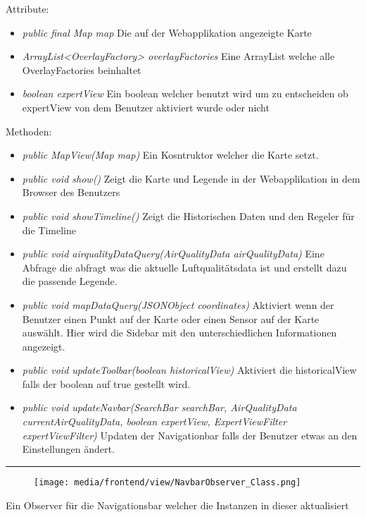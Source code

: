 Attribute:
\begin{itemize} 
    \item \emph{public final Map map} Die auf der Webapplikation angezeigte Karte
    \item \emph{ArrayList<OverlayFactory> overlayFactories} Eine ArrayList welche alle OverlayFactories beinhaltet
    \item \emph{boolean expertView} Ein boolean welcher benutzt wird um zu entscheiden ob expertView von dem Benutzer aktiviert wurde oder nicht
\end{itemize} 
Methoden:
\begin{itemize} 
    \item \emph{public MapView(Map map)} Ein Kosntruktor welcher die Karte setzt.
    \item \emph{public void show()} Zeigt die Karte und Legende in der Webapplikation in dem Browser des Benutzers
    \item \emph{public void showTimeline()} Zeigt die Historischen Daten und den Regeler für die Timeline
    \item \emph{public void airqualityDataQuery(AirQualityData airQualityData)} Eine Abfrage die abfragt was die aktuelle Luftqualitätsdata ist und erstellt dazu die passende Legende. 
    \item \emph{public void mapDataQuery(JSONObject coordinates)} Aktiviert wenn der Benutzer einen Punkt auf der Karte oder einen Sensor auf der Karte auswählt. Hier wird die Sidebar mit den unterschiedlichen Informationen angezeigt.
    \item \emph{public void updateToolbar(boolean historicalView)} Aktiviert die historicalView falls der boolean auf true gestellt wird.
    \item \emph{public void updateNavbar(SearchBar searchBar, AirQualityData currentAirQualityData,
    boolean expertView, ExpertViewFilter expertViewFilter)} Updaten der Navigationbar falls der Benutzer etwas an den Einstellungen ändert.
\end{itemize} 

\rule{\textwidth}{0.4pt} 
\begin{minipage}{0.3\textwidth}
    \begin{figure}[H]
        \texttt{[image: media/frontend/view/NavbarObserver\_Class.png]}
    \end{figure}
    \end{minipage} \hfill
    \begin{minipage}{0.6\textwidth}
Ein Observer für die Navigationsbar welcher die Instanzen in dieser aktualisiert
\end{minipage}

